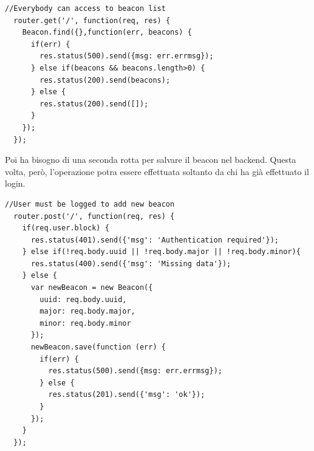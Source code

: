 \begin{lstlisting}[caption={/webserver/app/routes/beacon.js get}, style=javaScriptCode]
  //Everybody can access to beacon list
  router.get('/', function(req, res) {
    Beacon.find({},function(err, beacons) {
      if(err) {
        res.status(500).send({msg: err.errmsg});
      } else if(beacons && beacons.length>0) {
        res.status(200).send(beacons);
      } else {
        res.status(200).send([]);
      }
    });
  });
\end{lstlisting}
Poi ha bisogno di una seconda rotta per salvare il beacon nel backend.
Questa volta, però, l'operazione potra essere effettuata soltanto da chi ha già effettuato il login.
\begin{lstlisting}[caption={/webserver/app/routes/beacon.js aggiunta}, style=javaScriptCode]
  //User must be logged to add new beacon
  router.post('/', function(req, res) {
    if(req.user.block) {
      res.status(401).send({'msg': 'Authentication required'});
    } else if(!req.body.uuid || !req.body.major || !req.body.minor){
      res.status(400).send({'msg': 'Missing data'});
    } else {
      var newBeacon = new Beacon({
        uuid: req.body.uuid,
        major: req.body.major,
        minor: req.body.minor
      });
      newBeacon.save(function (err) {
        if(err) {
          res.status(500).send({msg: err.errmsg});
        } else {
          res.status(201).send({'msg': 'ok'});
        }
      });
    }
  });
\end{lstlisting}